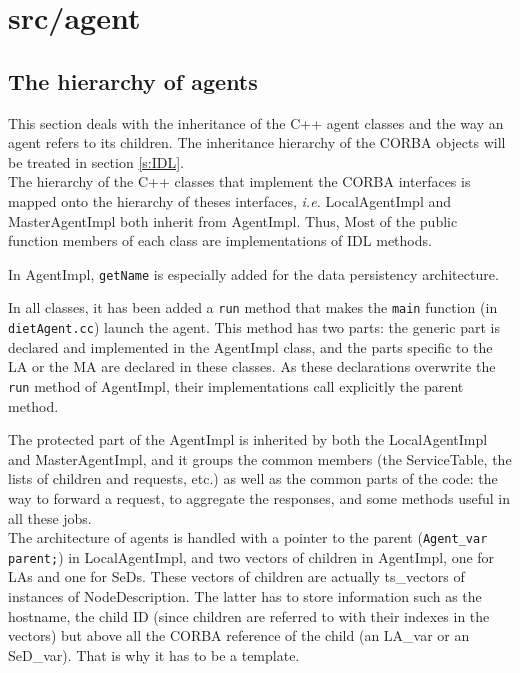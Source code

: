 \section{\textsf{src/agent}}
\label{s:agent}

\subsection{The hierarchy of agents}

This section deals with the inheritance of the C++ agent classes and the way an
agent refers to its children. The inheritance hierarchy of the CORBA objects
will be treated in section \ref{s:IDL}.
\\

The hierarchy of the C++ classes that implement the CORBA interfaces is mapped
onto the hierarchy of theses interfaces, \emph{i.e.} \textsf{LocalAgentImpl} and
\textsf{MasterAgentImpl} both inherit from \textsf{AgentImpl}. Thus, Most of the
public function members of each class are implementations of IDL methods.

In \textsf{AgentImpl}, \texttt{getName} is especially added for the data
persistency architecture.

In all classes, it has been added a \texttt{run} method that makes the
\texttt{main} function (in \texttt{dietAgent.cc}) launch the agent. This method
has two parts: the generic part is declared and implemented in the
\textsf{AgentImpl} class, and the parts specific to the LA or the MA are
declared in these classes. As these declarations overwrite the \texttt{run}
method of \textsf{AgentImpl}, their implementations call explicitly the parent
method.

The protected part of the \textsf{AgentImpl} is inherited by both the
\textsf{LocalAgentImpl} and \textsf{MasterAgentImpl}, and it groups the common
members (the \textsf{ServiceTable}, the lists of children and requests, etc.) as
well as the common parts of the code: the way to forward a request, to aggregate
the responses, and some methods useful in all these jobs.
\\

The architecture of agents is handled with a pointer to the parent
(\verb+Agent_var parent;+) in \textsf{LocalAgentImpl}, and two vectors of children
in \textsf{AgentImpl}, one for LAs and one for SeDs. These vectors of children are
actually \textsf{ts\_vectors} of instances of \textsf{NodeDescription}. The
latter has to store information such as the hostname, the child ID (since
children are referred to with their indexes in the vectors) but above all the
CORBA reference of the child (an \textsf{LA\_var} or an \textsf{SeD\_var}). That
is why it has to be a template.


